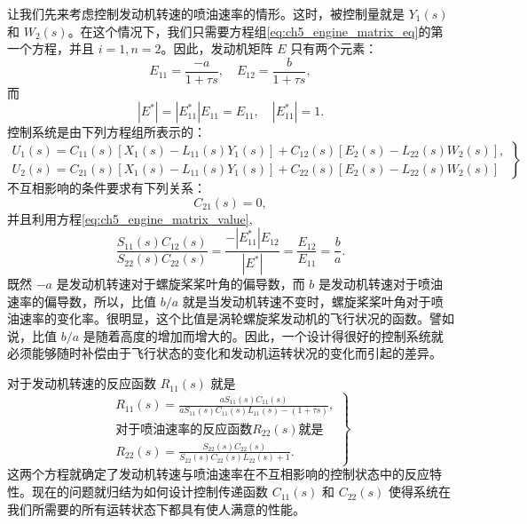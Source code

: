 让我们先来考虑控制发动机转速的喷油速率的情形。这时，被控制量就是 $Y_1(s)$ 和 $W_2(s)$。在这个情况下，我们只需要方程组\eqref{eq:ch5_engine_matrix_eq}的第一个方程，并且 $i=1, n=2$。因此，发动机矩阵 $E$ 只有两个元素：
\begin{equation}\label{eq:ch5_engine_matrix_element}
E_{11} = \frac{-a}{1+\tau s}, \quad E_{12} = \frac{b}{1+\tau s},
\end{equation}
而
\begin{equation}\label{eq:ch5_engine_matrix_value}
|E^*| = |E_{11}^*| E_{11} = E_{11}, \quad |E_{11}^*| = 1.
\end{equation}
控制系统是由下列方程组所表示的：
\begin{equation}\label{eq:ch5_control_eq_U1_U2}
\left.
\begin{array}{l}
U_1(s) = C_{11}(s)[X_1(s) - L_{11}(s)Y_1(s)] + C_{12}(s)[E_2(s) - L_{22}(s)W_2(s)],\\
U_2(s) = C_{21}(s)[X_1(s) - L_{11}(s)Y_1(s)] + C_{22}(s)[E_2(s) - L_{22}(s)W_2(s)]
\end{array}
\right\}
\end{equation}
不互相影响的条件要求有下列关系：
\begin{equation}\label{eq:ch5_noninteraction_C21}
C_{21}(s) = 0,
\end{equation}
并且利用方程\eqref{eq:ch5_engine_matrix_value},
\begin{equation}\label{eq:ch5_noninteraction_ratio_1}
\frac{S_{11}(s)C_{12}(s)}{S_{22}(s)C_{22}(s)} = \frac{-|E_{11}^*| E_{12}}{|E^*|} = \frac{E_{12}}{E_{11}} = \frac{b}{a}.
\end{equation}
既然 $-a$ 是发动机转速对于螺旋桨桨叶角的偏导数，而 $b$ 是发动机转速对于喷油速率的偏导数，所以，比值 $b/a$ 就是当发动机转速不变时，螺旋桨桨叶角对于喷油速率的变化率。很明显，这个比值是涡轮螺旋桨发动机的飞行状况的函数。譬如说，比值 $b/a$ 是随着高度的增加而增大的。因此，一个设计得很好的控制系统就必须能够随时补偿由于飞行状态的变化和发动机运转状况的变化而引起的差异。

对于发动机转速的反应函数 $R_{11}(s)$ 就是
\begin{equation}\label{eq:ch5_response_R11_R22}
\left.
\begin{array}{l}
R_{11}(s) = \frac{aS_{11}(s)C_{11}(s)}{aS_{11}(s)C_{11}(s)L_{11}(s) - (1+\tau s)},\\
\text{对于喷油速率的反应函数}R_{22}(s)\text{就是}\\
R_{22}(s) = \frac{S_{22}(s)C_{22}(s)}{S_{22}(s)C_{22}(s)L_{22}(s) + 1}.
\end{array}
\right\}
\end{equation}
这两个方程就确定了发动机转速与喷油速率在不互相影响的控制状态中的反应特性。现在的问题就归结为如何设计控制传递函数 $C_{11}(s)$ 和 $C_{22}(s)$ 使得系统在我们所需要的所有运转状态下都具有使人满意的性能。

